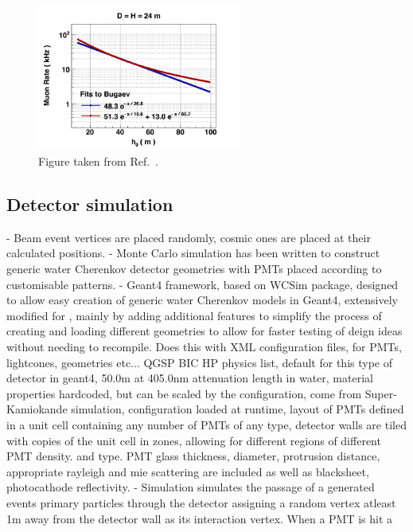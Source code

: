 \begin{figure} %
    \includegraphics[width=0.6\textwidth]{diagrams/4-chips/cosmic_rate.png}
    \caption[cosmic rate]
    {Figure taken from Ref.~\cite{son2013}.}
    \label{fig:cosmic_rate}
\end{figure}

\subsection{Detector simulation} %
\label{sec:chips_monte_carlo_sim} %

- Beam event vertices are placed randomly, cosmic ones are placed at their calculated positions.
- Monte Carlo simulation has been written to construct generic water Cherenkov detector
geometries with PMTs placed according to customisable patterns.
- Geant4 framework, based on WCSim package, designed to allow easy creation of generic water
Cherenkov models in Geant4, extensively modified for \chips, mainly by adding additional features
to simplify the process of creating and loading different geometries to allow for faster testing
of deign ideas without needing to recompile. Does this with XML configuration files, for PMTs,
lightcones, geometries etc... QGSP BIC HP physics list, default for this type of detector in
geant4, 50.0m at 405.0nm attenuation length in water, material properties hardcoded, but can be
scaled by the configuration, come from Super-Kamiokande simulation, configuration loaded at
runtime, layout of PMTs defined in a unit cell containing any number of PMTs of any type, detector
walls are tiled with copies of the unit cell in zones, allowing for different regions of different
PMT density. and type. PMT glass thickness, diameter, protrusion distance, appropriate rayleigh
and mie scattering are included as well as blacksheet, photocathode reflectivity.
- Simulation simulates the passage of a generated events primary particles through the detector
assigning a random vertex atleast 1m away from the detector wall as its interaction vertex. When a
PMT is hit a


